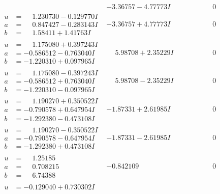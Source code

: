 \documentclass[1p]{elsarticle_modified}
\theoremstyle{definition}
\begin{document}
$$\begin{array}{c|c|c}
 & -3.36757 - 4.77773 I & \phantom{-0.000000 } 0 \\ \hline\begin{aligned}
u &= \phantom{-}1.230730 - 0.129770 I \\
a &= \phantom{-}0.847427 - 0.283143 I \\
b &= \phantom{-}1.58411 + 1.41763 I\end{aligned}
 & -3.36757 + 4.77773 I & \phantom{-0.000000 } 0 \\ \hline\begin{aligned}
u &= \phantom{-}1.175080 + 0.397243 I \\
a &= -0.586512 - 0.763040 I \\
b &= -1.220310 + 0.097965 I\end{aligned}
 & \phantom{-}5.98708 + 2.35229 I & \phantom{-0.000000 } 0 \\ \hline\begin{aligned}
u &= \phantom{-}1.175080 - 0.397243 I \\
a &= -0.586512 + 0.763040 I \\
b &= -1.220310 - 0.097965 I\end{aligned}
 & \phantom{-}5.98708 - 2.35229 I & \phantom{-0.000000 } 0 \\ \hline\begin{aligned}
u &= \phantom{-}1.190270 + 0.350522 I \\
a &= -0.790578 + 0.647954 I \\
b &= -1.292380 - 0.473108 I\end{aligned}
 & -1.87331 + 2.61985 I & \phantom{-0.000000 } 0 \\ \hline\begin{aligned}
u &= \phantom{-}1.190270 - 0.350522 I \\
a &= -0.790578 - 0.647954 I \\
b &= -1.292380 + 0.473108 I\end{aligned}
 & -1.87331 - 2.61985 I & \phantom{-0.000000 } 0 \\ \hline\begin{aligned}
u &= \phantom{-}1.25185\phantom{ +0.000000I} \\
a &= \phantom{-}0.708215\phantom{ +0.000000I} \\
b &= \phantom{-}6.74388\phantom{ +0.000000I}\end{aligned}
 & -0.842109\phantom{ +0.000000I} & \phantom{-0.000000 } 0 \\ \hline\begin{aligned}
u &= -0.129040 + 0.730302 I \\

\end{aligned}
\end{array}$$
\end{document}
